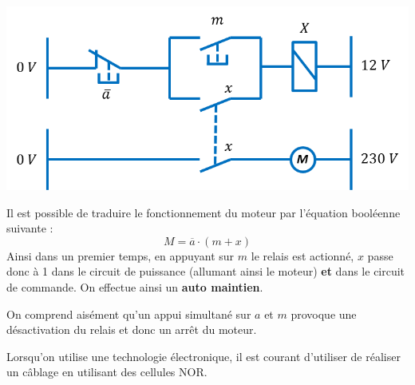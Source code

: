 \documentclass[10pt,fleqn]{article} %
\begin{document}
 
\begin{minipage}[c]{.5\linewidth}
\begin{center}
\includegraphics[width=\textwidth]{images/mem_eff}
\end{center}
\end{minipage} \hfill
\begin{minipage}[c]{.47\linewidth}
Il est possible de traduire le fonctionnement du moteur par l'équation booléenne suivante : 
$$
M = \overline{a} \cdot \left(m +  x \right)
$$
Ainsi dans un premier temps, en appuyant sur $m$ le relais est actionné, $x$ passe donc à 1 dans le circuit de puissance (allumant ainsi le moteur) \textbf{et} dans le circuit de commande. On effectue ainsi un \textbf{auto maintien}. 

On comprend aisément qu'un appui simultané sur $a$ et $m$ provoque une désactivation du relais et donc un arrêt du moteur. 
\end{minipage}

\vspace{.2cm}

Lorsqu'on utilise une technologie électronique, il est courant d'utiliser de réaliser un câblage en utilisant des cellules NOR. 

\vspace{.2cm}
\end{document}
